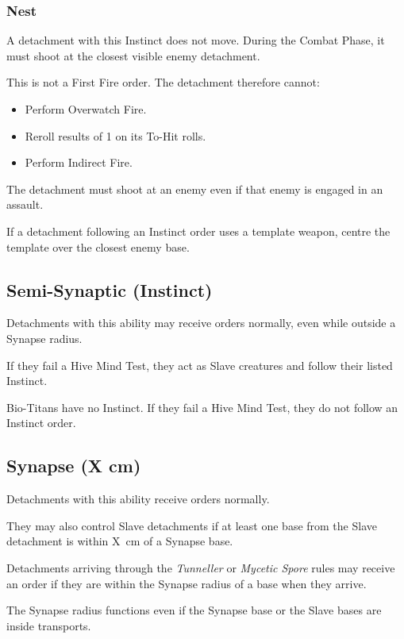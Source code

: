 \subsubsection{Nest}

A detachment with this Instinct does not move. During the Combat Phase, it must shoot at the closest visible enemy detachment.

This is not a First Fire order. The detachment therefore cannot:

\begin{itemize}
    \item Perform Overwatch Fire.
    \item Reroll results of 1 on its To-Hit rolls.
    \item Perform Indirect Fire.
\end{itemize}

The detachment must shoot at an enemy even if that enemy is engaged in an assault.

If a detachment following an Instinct order uses a template weapon, centre the template over the closest enemy base.

\subsection{Semi-Synaptic (Instinct)}

Detachments with this ability may receive orders normally, even while outside a Synapse radius.

If they fail a Hive Mind Test, they act as Slave creatures and follow their listed Instinct.

Bio-Titans have no Instinct. If they fail a Hive Mind Test, they do not follow an Instinct order.

\subsection{Synapse (X cm)}

Detachments with this ability receive orders normally.

They may also control Slave detachments if at least one base from the Slave detachment is within X~cm of a Synapse base.

Detachments arriving through the \textit{Tunneller} or \textit{Mycetic Spore} rules may receive an order if they are within the Synapse radius of a base when they arrive.

The Synapse radius functions even if the Synapse base or the Slave bases are inside transports.

